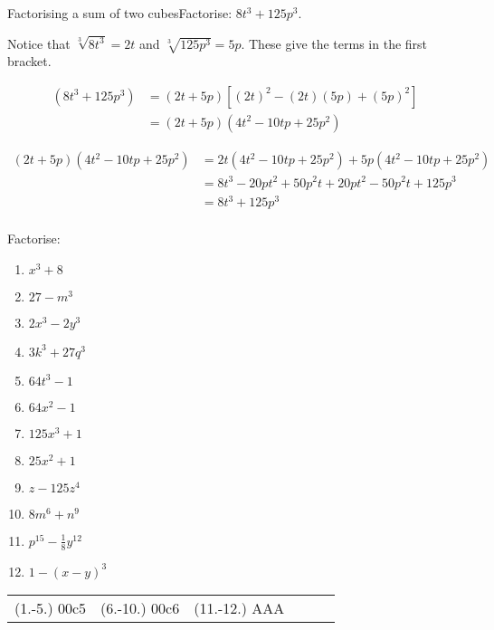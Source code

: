 \begin{wex}{Factorising a sum of two cubes}{Factorise:  $8t^{3} +125p^{3}$.}
{

Notice that $\sqrt[3]{8t^{3}} = 2t$ and $\sqrt[3]{125p^{3}} = 5p$. These give the terms in the first bracket.

\begin{align*}
  (8t^{3} +125p^{3}) &= (2t + 5p)\left[(2t)^{2} - (2t)(5p)+(5p)^{2}\right] \\
                     &= (2t+5p)(4t^{2} - 10tp + 25p^{2})
\end{align*}

\begin{align*}
  (2t+5p)(4t^{2} - 10tp + 25p^{2}) &= 2t(4t^{2} - 10tp + 25p^{2})+5p(4t^{2} - 10tp + 25p^{2})\\
		   &= 8t^{3} - 20pt^{2} + 50p^{2}t+ 20pt^{2} - 50p^{2}t + 125p^{3}\\
		   &= 8t^{3} +125p^{3}\\
\end{align*}

}
\end{wex}


\begin{exercises}{}
{Factorise:
\begin{multicols}{2}
\begin{enumerate}[itemsep=5pt, label=\textbf{\arabic*}. ] 
\item ${x}^{3}+8$
\item $27-m^{3}$
\item $2x^{3}-2y^{3}$
\item $3k^{3} + 27q^{3}$
\item $64t^{3}-1$
\item $64x^{2} -1$
\item $125x^{3} +1$
\item $25x^{2} +1$
\item $z-125z^4{}$
\item $8m^{6} + n^{9}$
\item $p^{15} - \frac{1}{8}y^{12}$
\item $1- (x-y)^3$
\end{enumerate}
\end{multicols}
\practiceinfo 
\par 
 \par \begin{tabular}[h]{cccccc}
 (1.-5.) 00c5& (6.-10.) 00c6&  (11.-12.) AAA\end{tabular}
}
\end{exercises}

